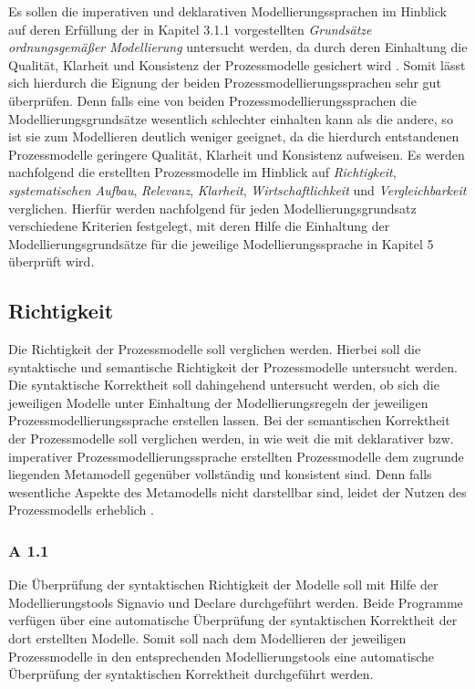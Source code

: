 Es sollen die imperativen und deklarativen Modellierungssprachen im Hinblick auf deren Erfüllung der in Kapitel 3.1.1 vorgestellten \textit{Grundsätze ordnungsgemäßer Modellierung} untersucht werden, da durch deren Einhaltung die Qualität, Klarheit und Konsistenz der Prozessmodelle gesichert wird \cite{freund2007}. Somit lässt sich hierdurch die Eignung der beiden Prozessmodellierungssprachen sehr gut überprüfen. Denn falls eine von beiden Prozessmodellierungssprachen die Modellierungsgrundsätze wesentlich schlechter einhalten kann als die andere, so ist sie zum Modellieren deutlich weniger geeignet, da die hierdurch entstandenen Prozessmodelle geringere Qualität, Klarheit und Konsistenz aufweisen. Es werden nachfolgend die erstellten Prozessmodelle im Hinblick auf \textit{Richtigkeit}, \textit{systematischen Aufbau}, \textit{Relevanz}, \textit{Klarheit}, \textit{Wirtschaftlichkeit} und \textit{Vergleichbarkeit} verglichen. Hierfür werden nachfolgend für jeden Modellierungsgrundsatz verschiedene Kriterien festgelegt, mit deren Hilfe die Einhaltung der Modellierungsgrundsätze für die jeweilige Modellierungssprache in Kapitel 5 überprüft wird. \newline

\subsection{Richtigkeit}
Die Richtigkeit der Prozessmodelle soll verglichen werden. Hierbei soll die syntaktische und semantische Richtigkeit der Prozessmodelle untersucht werden. Die syntaktische Korrektheit soll dahingehend untersucht werden, ob sich die jeweiligen Modelle unter Einhaltung der Modellierungsregeln der jeweiligen Prozessmodellierungssprache erstellen lassen. Bei der semantischen Korrektheit der Prozessmodelle soll verglichen werden, in wie weit die mit deklarativer bzw. imperativer Prozessmodellierungssprache erstellten Prozessmodelle dem zugrunde liegenden Metamodell gegenüber vollständig und konsistent sind. Denn falls wesentliche Aspekte des Metamodells nicht darstellbar sind, leidet der Nutzen des Prozessmodells erheblich \cite{journals95, freund2007, becker2012prozessmanagement,koch2011}.  \newline

\subsubsection{A 1.1}

Die Überprüfung der syntaktischen Richtigkeit der Modelle soll mit Hilfe der Modellierungstools Signavio und Declare durchgeführt werden. Beide Programme verfügen über eine automatische Überprüfung der syntaktischen Korrektheit der dort erstellten Modelle. Somit soll nach dem Modellieren der jeweiligen Prozessmodelle in den entsprechenden Modellierungstools eine automatische Überprüfung der syntaktischen Korrektheit durchgeführt werden. \newline

